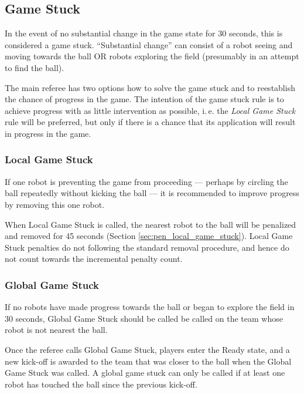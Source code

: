 \documentclass[12pt]{article}
\newcommand{\ie}{\mbox{i.\,e.}\xspace}
\begin{document}
\subsection{Game Stuck}
\label{sec:game_stuck}

In the event of no substantial change in the game state for 30 seconds, this is considered a game stuck.  ``Substantial change'' can consist of a robot seeing and moving towards the ball OR robots exploring the field (presumably in an attempt to find the ball).

The main referee has two options how to solve the game stuck and to reestablish the chance of progress in the game. The intention of the game stuck rule is to achieve progress with as little intervention as possible, \ie the \emph{Local Game Stuck} rule will be preferred, but only if there is a chance that its application will result in progress in the game.

\subsubsection{Local Game Stuck}
\label{sec:game_stuck:local}

If one robot is preventing the game from proceeding --- perhaps by circling the ball repeatedly without kicking the ball --- it is recommended to improve progress by removing this one robot.

When Local Game Stuck is called, the nearest robot to the ball will be penalized and removed for 45 seconds (Section \ref{sec:pen_local_game_stuck}). Local Game Stuck penalties do not following the standard removal procedure, and hence do not count towards the incremental penalty count.

\subsubsection{Global Game Stuck}
\label{sec:game_stuck:global}

If no robots have made progress towards the ball or began to explore the field in 30 seconds, Global Game Stuck should be called be called on the team whose robot is not nearest the ball.

Once the referee calls Global Game Stuck, players enter the Ready state, and a new kick-off is awarded to the team that was closer to the ball when the Global Game Stuck was called. A global game stuck can only be called if at least one robot has touched the ball since the previous kick-off.
\end{document}

